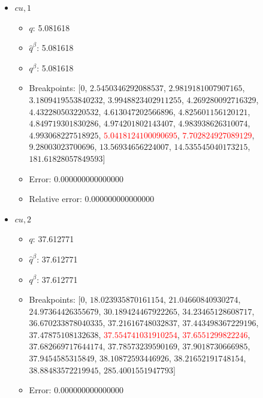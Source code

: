 \documentclass{article}%
\begin{document}
\begin{itemize}
\begin{itemize}
		\item Breakpoints: $[$$0$, $9.898970403313276$, $28.333333333333332$, $42.69900440382105$, $48.67452649027746$, $79.83702775273511$, $87.16107999267206$, $118.88765652962957$, $128.52021081477858$, $131.69760457629607$, $132.12228195956155$, $135.81963163113545$, $139.47623233772285$, $140.7008934199032$, \textcolor{red}{$142.4338700260237$}, \textcolor{red}{$144.70843093515643$}, $147.07009017600456$, $147.48374761404892$, $149.84689443310864$, $720.0$$]$%
		\item Error: 0.000000000000000%
		\item Relative error: 0.000000000000000%
	\end{itemize}%
	\item $\textit{cu},1$%
	\begin{itemize}%
		\item $q$: 5.081618%
		\item $\hat{q}^\beta$: 5.081618%
		\item $q^\beta$: 5.081618%
		\item Breakpoints: $[$$0$, $2.5450346292088537$, $2.9819181007907165$, $3.1809419553840232$, $3.9948823402911255$, $4.269280092716329$, $4.432280503220532$, $4.613047202566896$, $4.825601156120121$, $4.849719301830286$, $4.974201802143407$, $4.983938626310074$, $4.993068227518925$, \textcolor{red}{$5.0418124100090695$}, \textcolor{red}{$7.702824927089129$}, $9.28003023700696$, $13.56934656224007$, $14.535545040173215$, $181.61828057849593$$]$%
		\item Error: 0.000000000000000%
		\item Relative error: 0.000000000000000%
	\end{itemize}%
	\item $\textit{cu},2$%
	\begin{itemize}%
		\item $q$: 37.612771%
		\item $\hat{q}^\beta$: 37.612771%
		\item $q^\beta$: 37.612771%
		\item Breakpoints: $[$$0$, $18.023935870161154$, $21.04660840930274$, $24.97364426355679$, $30.189424467922265$, $34.23465128608717$, $36.670233878040335$, $37.21616748032837$, $37.443498367229196$, $37.47875108132638$, \textcolor{red}{$37.554741031910254$}, \textcolor{red}{$37.6551299822246$}, $37.682669717644174$, $37.78573239590169$, $37.9018730666985$, $37.9454585315849$, $38.10872593446926$, $38.21652191748154$, $38.88483572219945$, $285.4001551947793$$]$%
		\item Error: 0.000000000000000%

\end{itemize}
\end{itemize}
\end{document}
